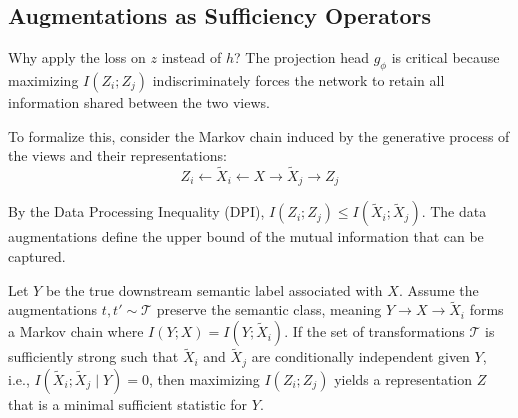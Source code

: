 \subsection{Augmentations as Sufficiency Operators}

Why apply the loss on $z$ instead of $h$? The projection head $g_\phi$ is critical because maximizing $I(Z_i; Z_j)$ indiscriminately forces the network to retain all information shared between the two views. 

To formalize this, consider the Markov chain induced by the generative process of the views and their representations:
\begin{equation}
    Z_i \leftarrow \tilde{X}_i \leftarrow X \rightarrow \tilde{X}_j \rightarrow Z_j
\end{equation}

By the Data Processing Inequality (DPI), $I(Z_i; Z_j) \leq I(\tilde{X}_i; \tilde{X}_j)$. The data augmentations define the upper bound of the mutual information that can be captured. 

\begin{theorem}
\label{thm:sufficient_stats}
Let $Y$ be the true downstream semantic label associated with $X$. Assume the augmentations $t, t' \sim \mathcal{T}$ preserve the semantic class, meaning $Y \to X \to \tilde{X}_i$ forms a Markov chain where $I(Y; X) = I(Y; \tilde{X}_i)$. If the set of transformations $\mathcal{T}$ is sufficiently strong such that $\tilde{X}_i$ and $\tilde{X}_j$ are conditionally independent given $Y$, i.e., $I(\tilde{X}_i; \tilde{X}_j \mid Y) = 0$, then maximizing $I(Z_i; Z_j)$ yields a representation $Z$ that is a minimal sufficient statistic for $Y$.
\end{theorem}

